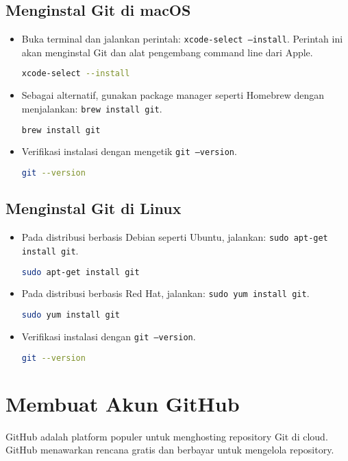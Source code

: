 \subsection{Menginstal Git di macOS}
\begin{itemize}
	\item Buka terminal dan jalankan perintah: \texttt{xcode-select --install}. Perintah ini akan menginstal Git dan alat pengembang command line dari Apple.
	\begin{lstlisting}[language=bash]
		xcode-select --install
	\end{lstlisting}
	\item Sebagai alternatif, gunakan package manager seperti Homebrew dengan menjalankan: \texttt{brew install git}.
	\begin{lstlisting}[language=bash]
		brew install git
	\end{lstlisting}
	\item Verifikasi instalasi dengan mengetik \texttt{git --version}.
	\begin{lstlisting}[language=bash]
		git --version
	\end{lstlisting}
\end{itemize}

\subsection{Menginstal Git di Linux}
\begin{itemize}
	\item Pada distribusi berbasis Debian seperti Ubuntu, jalankan: \texttt{sudo apt-get install git}.
	\begin{lstlisting}[language=bash]
		sudo apt-get install git
	\end{lstlisting}
	\item Pada distribusi berbasis Red Hat, jalankan: \texttt{sudo yum install git}.
	\begin{lstlisting}[language=bash]
		sudo yum install git
	\end{lstlisting}
	\item Verifikasi instalasi dengan \texttt{git --version}.
	\begin{lstlisting}[language=bash]
		git --version
	\end{lstlisting}
\end{itemize}

\section{Membuat Akun GitHub}
GitHub adalah platform populer untuk menghosting repository Git di cloud. GitHub menawarkan rencana gratis dan berbayar untuk mengelola repository.

